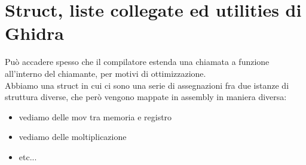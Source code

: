 \documentclass[12pt, oneside]{extbook}
\begin{document}
\section{Struct, liste collegate ed utilities di Ghidra}
Può accadere spesso che il compilatore estenda una chiamata a funzione all'interno del chiamante, per motivi di ottimizzazione.\\ Abbiamo una struct in cui ci sono una serie di assegnazioni fra due istanze di struttura diverse, che però vengono mappate in assembly in maniera diversa: 
\begin{itemize}
\item vediamo delle mov tra memoria e registro
\item vediamo delle  moltiplicazione
\item etc...
\end{itemize}
\end{document}
